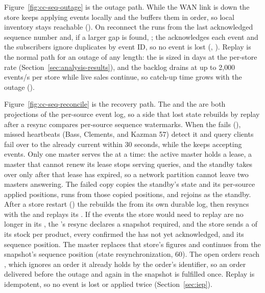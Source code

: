 Figure~\ref{fig:cc-seq-outage} is the outage path. While the WAN link is down the store
keeps applying events locally and the \Outbox buffers them in order, so local inventory
stays reachable (). On reconnect the \Outbox runs \opReplay from the last
acknowledged sequence number and, if a larger gap is found, \opResync; the \CFE
acknowledges each event and the subscribers ignore duplicates by event ID, so no event is
lost (, ). Replay is the normal path for an outage of any
length: the \Outbox is sized in days at the per-store rate
(Section~\ref{sec:analysis-results}), and the backlog drains at up to 2{,}000 events/s per
store while live sales continue, so catch-up time grows with the outage
().

Figure~\ref{fig:cc-seq-reconcile} is the recovery path. The \StoreLocalInventory and the
\CentralMasterInventory are both projections of the per-source event log, so a side that
lost state rebuilds by replay after a resync compares per-source sequence watermarks. When
the \CentralMasterInventory fails (), missed heartbeats (Bass, Clements, and
Kazman 57) detect it and query clients fail over to the already current \StandbyMaster
within 30 seconds, while the \CFE keeps accepting events. Only one master serves the
\InventoryQuery at a time: the active master holds a lease, a master that cannot renew its
lease stops serving queries, and the standby takes over only after that lease has expired,
so a network partition cannot leave two masters answering. The failed copy copies the
standby's state and its per-source applied positions, runs \opReplay from those copied
positions, and rejoins as the standby. After a
store restart () the \StoreAgent rebuilds the \StoreLocalInventory from
its own durable log, then resyncs with the \CFE and replays its \Outbox. If the events
the store would need to replay are no longer in its \Outbox, the \CFE's resync declares
a snapshot required, and the store sends a \StoreSnapshot of its stock per product, every
confirmed \ShippingOrder the \DC has not yet acknowledged, and its sequence position. The
master replaces that store's figures and continues from the snapshot's sequence position
(state resynchronization, 60). The open orders reach \ShippingOrderFulfillment, which ignores
an order it already holds by the order's identifier, so an order delivered before the outage
and again in the snapshot is fulfilled once. Replay is idempotent, so no event is lost or applied twice
(Section~\ref{sec:iep}).

